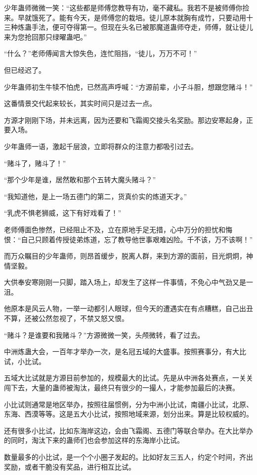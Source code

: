 \begin{this_body}
少年蛊师微微一笑：“这些都是师傅您教导有功，毫不藏私。我若不是被师傅你捡来。早就饿死了。能有今天，是师傅您的栽培。徒儿原本就胸有成竹，只要动用十三种炼蛊手法，便可夺得第一。但现在头名已被那魔道蛊师夺走，师傅，就让徒儿来为您抢回那只绿曜蛊吧。”

“什么？”老师傅闻言大惊失色，连忙阻挡，“徒儿，万万不可！”

但已经迟了。

少年蛊师初生牛犊不怕虎，已然高声呼喊：“方源前辈，小子斗胆，想跟您赌斗！”

这番情景交代起来较长，其实时间只是过去一点。

方源才刚刚下场，并未远离，因为还要和飞霜阁交接头名奖励。那边安寒起身，正要入场。

少年蛊师一语，激起千层浪，立即将群众的注意力都吸引过去。

“赌斗了，赌斗了！”

“那个少年是谁，居然敢和那个五转大魔头赌斗？”

“我知道他，是上一场五德门的第二，货真价实的炼道天才。”

“乳虎不惧老狮威，这下有好戏看了！”

老师傅面色惨然，已经阻止不及，立在原地手足无措，心中万分的担忧和悔恨：“自己只顾着传授徒弟炼道，忘了教导他世事艰难凶险。千不该，万不该啊！”

而万众瞩目的少年蛊师，则昂首缓步，脱离人群，来到方源的面前，目光炯炯，神情坚毅。

大供奉安寒刚刚一只脚，踏入场上，却发生了这样一件事情，不免心中气劲又是一沮。

他原本是风云人物，一举一动都引人眼球，但今天的遭遇实在有点糟糕，自己出丑不算，还被公然忽视了，不禁又怒又恨。

“赌斗？是谁要和我赌斗？”方源微微一笑，头颅微转，看了过去。

中洲炼蛊大会，一百年才举办一次，是名冠五域的大盛事。按照赛事分，有大比试，小比试。

五域大比试就是方源目前参加的，规模最大的比试。先是从中洲各处赛点，一关关闯下去，大量的蛊师被淘汰，最终只有很少的一撮人，才能参加最后的决赛。

小比试则通常是地区举办，按照往届惯例，分为中洲小比试，南疆小比试，北原、东海、西漠等等。这是五大小比试，按照地域来源，划分出来。算是比较权威的。

还有很多小比试，比如东海岸这边，会由飞霜阁、五德门等联合举办。在大比举办的同时，淘汰下来的蛊师们也会参加这样的东海岸小比试。

数量最多的小比试，是一个个小圈子发起的。比如好友三五人，约定个时间，齐出奖励，或者干脆没有奖品，进行相互比试。


\end{this_body}
